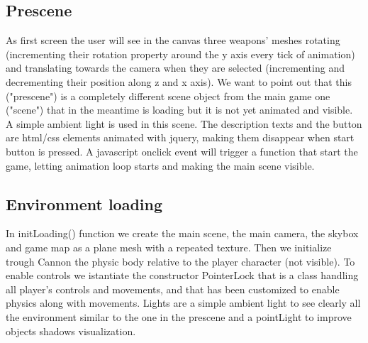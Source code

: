 \documentclass[14pt]{extarticle}
\begin{document}
\subsection {Prescene}
As first screen the user will see in the canvas three weapons' meshes rotating (incrementing their rotation property around the y axis every tick of animation) and translating towards the camera when they are selected (incrementing and decrementing their position along z and x axis). We want to point out that this ("prescene") is a completely different scene object from the main game one ("scene") that in the meantime is loading but it is not yet animated and visible. A simple ambient light is used in this scene. The description texts and the button are html/css elements animated with jquery, making them disappear when start button is pressed. A javascript onclick event will trigger a function that start the game, letting animation loop starts and making the main scene visible. 

\subsection {Environment loading}
In initLoading() function we create the main scene, the main camera, the skybox and game map as a plane mesh with a repeated texture. Then we initialize trough Cannon the physic body relative to the player character (not visible). To enable controls we istantiate the constructor PointerLock that is a class handling all player's controls and movements, and that has been customized to enable physics along with movements.
Lights are a simple ambient light to see clearly all the environment similar to the one in the prescene and a pointLight to improve objects shadows visualization.
\end{document}
